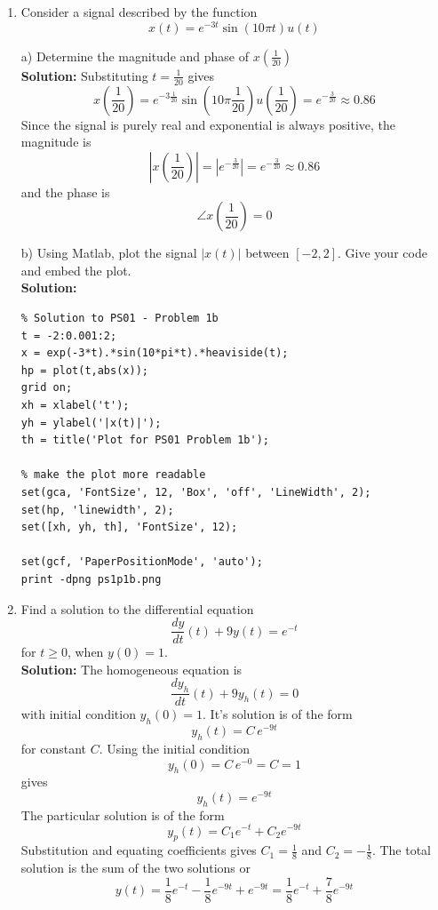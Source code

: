\begin{enumerate}

\item Consider a signal described by the function
  \[
  x(t) = e^{-3t}\sin(10\pi t)u(t)
  \]

  a) Determine the magnitude and phase of $x\left( \frac{1}{20}\right)$\\
  \textbf{Solution:}
  Substituting $t = \frac{1}{20}$ gives
  \[
  x\left( \frac{1}{20}\right) = e^{-3\frac{1}{20}}\sin\left(10\pi \frac{1}{20}\right)u\left( \frac{1}{20}\right) = e^{-\frac{3}{20}} \approx 0.86
  \]
  Since the signal is purely real and exponential is always positive, the magnitude is
  \[
  \left|x\left( \frac{1}{20}\right)\right| = \left| e^{-\frac{3}{20}}\right| =  e^{-\frac{3}{20}}  \approx 0.86
  \]
  and the phase is
  \[
  \angle x\left( \frac{1}{20}\right) = 0
  \]

  b) Using Matlab, plot the signal $|x(t)|$ between $[-2, 2]$. Give your code and embed the plot.\\

  \textbf{Solution:}
\begin{verbatim}
% Solution to PS01 - Problem 1b
t = -2:0.001:2;
x = exp(-3*t).*sin(10*pi*t).*heaviside(t);
hp = plot(t,abs(x));
grid on;
xh = xlabel('t');
yh = ylabel('|x(t)|');
th = title('Plot for PS01 Problem 1b');

% make the plot more readable
set(gca, 'FontSize', 12, 'Box', 'off', 'LineWidth', 2);
set(hp, 'linewidth', 2);
set([xh, yh, th], 'FontSize', 12);

set(gcf, 'PaperPositionMode', 'auto');
print -dpng ps1p1b.png
\end{verbatim}

  \item Find a solution to the differential equation
  \[
  \frac{dy}{dt}(t) + 9y(t) = e^{-t}
  \]
  for $t \geq 0$, when $y(0) = 1$.\\

  \textbf{Solution:}
  The homogeneous equation is
  \[
  \frac{dy_h}{dt}(t) + 9y_h(t) = 0
  \]
  with initial condition $y_h(0) = 1$. It's solution is of the form
  \[
  y_h(t) = C\, e^{-9t} 
  \]
  for constant $C$. Using the initial condition
  \[
  y_h(0) = C\, e^{-0} = C = 1
  \]
  gives
  \[
  y_h(t) = e^{-9t} 
  \]
  The particular solution is of the form
  \[
  y_p(t) = C_1 e^{-t} + C_2 e^{-9t}
  \]
  Substitution and equating coefficients gives $C_1 = \frac{1}{8}$ and $C_2 = -\frac{1}{8}$. The total solution is the sum of the two solutions or
  \[
  y(t) = \frac{1}{8} e^{-t} - \frac{1}{8} e^{-9t} + e^{-9t} = \frac{1}{8} e^{-t} + \frac{7}{8} e^{-9t}
  \]


\end{enumerate}
